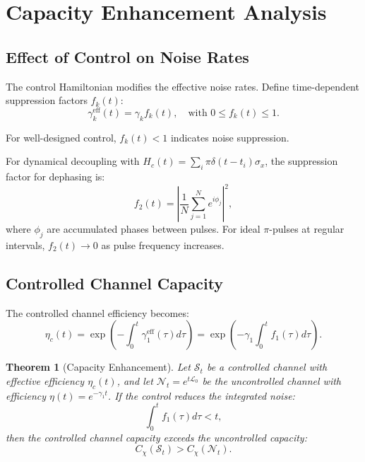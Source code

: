 \documentclass[11pt]{article}
\newtheorem{theorem}{Theorem}[section]
\begin{document}
\section{Capacity Enhancement Analysis}
\subsection{Effect of Control on Noise Rates}
The control Hamiltonian modifies the effective noise rates. Define time-dependent suppression factors $f_k(t)$:
\begin{equation}
\gamma_k^{\text{eff}}(t) = \gamma_k f_k(t), \quad \text{with } 0 \leq f_k(t) \leq 1.
\label{eq:suppression}
\end{equation}

For well-designed control, $f_k(t) < 1$ indicates noise suppression.

\begin{example}
For dynamical decoupling with $H_c(t) = \sum_i \pi \delta(t-t_i) \sigma_x$, the suppression factor for dephasing is:
\[
f_2(t) = \left| \frac{1}{N} \sum_{j=1}^N e^{i\phi_j} \right|^2,
\]
where $\phi_j$ are accumulated phases between pulses. For ideal $\pi$-pulses at regular intervals, $f_2(t) \to 0$ as pulse frequency increases.
\end{example}

\subsection{Controlled Channel Capacity}
The controlled channel efficiency becomes:
\begin{equation}
\eta_c(t) = \exp\left( -\int_0^t \gamma_1^{\text{eff}}(\tau) d\tau \right) = \exp\left( -\gamma_1 \int_0^t f_1(\tau) d\tau \right).
\label{eq:controlled_eta}
\end{equation}

\begin{theorem}[Capacity Enhancement]
Let $\mathcal{S}_t$ be a controlled channel with effective efficiency $\eta_c(t)$, and let $\mathcal{N}_t = e^{t\mathcal{L}_0}$ be the uncontrolled channel with efficiency $\eta(t) = e^{-\gamma_1 t}$. If the control reduces the integrated noise:
\[
\int_0^t f_1(\tau) d\tau < t,
\]
then the controlled channel capacity exceeds the uncontrolled capacity:
\[
C_\chi(\mathcal{S}_t) > C_\chi(\mathcal{N}_t).
\]
\end{theorem}
\end{document}
